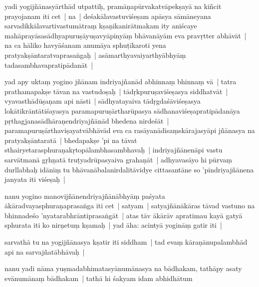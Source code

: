 \documentclass[article,12pt,a4paper]{memoir}%
\newcounter{parCount}
\begin{document}
	  \pstart \leavevmode%
	\label{thakur75-22.22}yadi yogijñānasyārthād utpattiḥ, pramāṇapūrvakatvāpekṣayā na kiñcit prayojanam iti cet | na | deśakālavastuviśeṣam apāsya sāmāneyana sarvadikkālavartivastumātraṃ kṣaṇikanirātmakam ity aniścaye mahāprayāsasādhyapuruṣāyuṣavyāpinyāṃ bhāvanāyām eva pravṛtter abhāvāt | na ca hāliko havyāśanam anumāya sphuṭīkaroti yena pratyakṣāntaratvaprasaṅgaḥ | asāmarthyavaiyarthyābhyāṃ tadasambhavapratipādanāt | 
	{}
	\pend%
      

	  \pstart \leavevmode%
	\label{thakur75-22.27}yad apy uktaṃ yogino jñānam indriyajñanād abhinnaṃ bhinnaṃ vā | tatra prathamapakṣe tāvan na vastudoṣaḥ | tādṛkpuruṣaviśeṣasya siddhatvāt | vyavasthādūṣaṇam api nāsti | sādhyatayaiva tādṛgdaśāviśeṣasya lokātikrāntātiśayasya paramapuruṣārtharūpasya sādhanaviśeṣapratipādanāya pṛthagjanasādhāraṇendriyajñānād bhedena nirdeśāt | paramapuruṣārthaviṣayatvābhāvād eva ca rasāyanādisaṃskārajasyāpi jñānasya na pratyakṣāntaratā | bhedapakṣe 'pi na tāvat sthairyetarasphuraṇakṛtopālambhasambhavaḥ | indriyajñānenāpi vastu sarvātmanā gṛhṇatā truṭyadrūpasyaiva grahaṇāt | adhyavasāyo hi pūrvaṃ durllabhaḥ idānīṃ tu bhāvanābalanirdalitāvidye cittasantāne so 'pīndriyajñānena janyata iti viśeṣaḥ | 
	{}
	\pend%
      

	  \pstart \leavevmode%
	\label{thakur75-23.3}nanu yogino manovijñānendriyajñānābhyāṃ paśyata ākāradvayasphuraṇaprasaṅga iti cet | satyam | satyajñānākāras tāvad vastuno na bhinnadeśo 'nyatarabhrāntiprasaṅgāt | atas tāv ākārāv apratimau kayā gatyā sphurata iti ko nirṇetuṃ kṣamaḥ | yad āha: acintyā yogināṃ gatir iti |
	{}
	\pend%
      

	  \pstart \leavevmode%
	\label{thakur75-23.7}sarvathā tu na yogijñānasya kṣatir iti siddham | tad evaṃ kāraṇānupalambhād api na sarvajñatābhāvaḥ | 
	{}
	\pend%
      

	  \pstart \leavevmode%
	\label{thakur75-23.9}nanu yadi nāma yuṣmadabhimatasyānumānasya na bādhakam, tathāpy asaty evānumānaṃ bādhakam | tathā hi śakyam idam abhidhātum 
	{}
	\pend%
      
\end{document}
